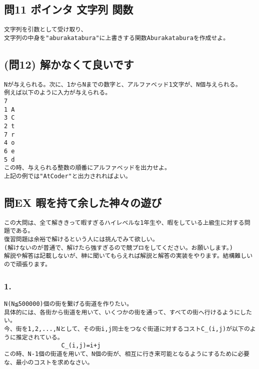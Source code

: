 \subsection{問11 ポインタ 文字列 関数}
\begin{verbatim}
文字列を引数として受け取り、
文字列の中身を"aburakatabura"に上書きする関数Aburakataburaを作成せよ。
\end{verbatim}
\subsection{(問12) 解かなくて良いです}
\begin{verbatim}
Nが与えられる。次に、1からNまでの数字と、アルファベッド1文字が、N個与えられる。
例えば以下のように入力が与えられる。
7
1 A
3 C
2 t
7 r
4 o
6 e
5 d
この時、与えられる整数の順番にアルファベッドを出力せよ。
上記の例では"AtCoder"と出力されればよい。
\end{verbatim}




\subsection{問EX 暇を持て余した神々の遊び}

\begin{verbatim}
この大問は、全て解ききって暇すぎるハイレベルな1年生や、暇をしている上級生に対する問題である。
復習問題は余裕で解けるという人には挑んでみて欲しい。
(解けないのが普通で、解けたら強すぎるので競プロをしてください。お願いします。)
解説や解答は記載しないが、榊に聞いてもらえれば解説と解答の実装をやります。結構難しいので頑張ります。
\end{verbatim}

\subsubsection{1.}
\begin{verbatim}
N(N≦500000)個の街を繋げる街道を作りたい。
具体的には、各街から街道を用いて、いくつかの街を通って、すべての街へ行けるようにしたい。
今、街を1,2,...,Nとして、その街i,j同士をつなぐ街道に対するコストC_(i,j)が以下のように推定されている。
                C_(i,j)=i+j
この時、N-1個の街道を用いて、N個の街が、相互に行き来可能となるようにするために必要な、最小のコストを求めなさい。
\end{verbatim}
